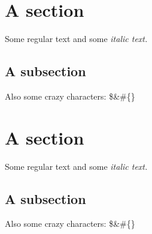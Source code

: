\documentclass{article}%
\begin{document}
%
\normalsize%
\section{A section}%
\label{sec:A section}%
Some regular text and some %
\textit{italic text. }%
\subsection{A subsection}%
\label{subsec:A subsection}%
Also some crazy characters: \$\&\#\{\}

%
\section{A section}%
\label{sec:A section}%
Some regular text and some %
\textit{italic text. }%
\subsection{A subsection}%
\label{subsec:A subsection}%
Also some crazy characters: \$\&\#\{\}

%
\end{document}
